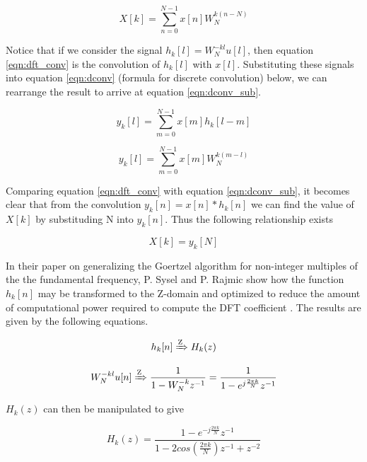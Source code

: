 \begin{equation}
\label{eqn:dft_conv}
X[k] = \sum_{n=0}^{N-1}x[n]W_{N}^{k(n-N)}
\end{equation}

Notice that if we consider the signal \(h_k[l] = W_N^{-kl}u[l]\), then equation \ref{eqn:dft_conv} is the convolution of $h_k[l]$ with $x[l]$. Substituting these signals into equation \ref{eqn:dconv} (formula for discrete convolution) below, we can rearrange the result to arrive at equation \ref{eqn:dconv_sub}.

\begin{equation}
	\label{eqn:dconv}
	y_k[l] = \sum_{m=0}^{N-1}x[m]h_k[l - m]
\end{equation}

\begin{equation}
	\label{eqn:dconv_sub}
y_k[l] = \sum_{m=0}^{N-1}x[m]W_N^{k(m-l)}
\end{equation}

Comparing equation \ref{eqn:dft_conv} with equation \ref{eqn:dconv_sub}, it becomes clear that from the convolution $y_k[n] = x[n] * h_k[n]$ we can find the value of $X[k]$ by substituding N into $y_k[n]$. Thus the following relationship exists

\begin{equation}
\label{eqn:goertzel_relationship}
X[k] = y_k[N]
\end{equation}


In their paper on generalizing the Goertzel algorithm for non-integer multiples of the the fundamental frequency, P. Sysel and P. Rajmic show how the function $h_k[n]$ may be transformed to the Z-domain and optimized to reduce the amount of computational power required to compute the DFT coefficient \cite{Sysel2012}. The results are given by the following equations.

\[h_k[n] \xRightarrow{\text{Z}} H_k(z)\]

\begin{equation}
W_N^{-kl}u[n] \xRightarrow{\text{Z}} \frac{1}{1 - W_N^{-k}z^{-1}} = \frac{1}{1 - e^{j\frac{2\pi k}{N}}z^{-1}}
\end{equation}

$H_k(z)$ can then be manipulated to give

\begin{equation}
\label{eqn:g_optimized_ir}
H_k(z) = \frac{1 - e^{-j\frac{2\pi k}{N}}z^{-1}}{1 - 2cos(\frac{2\pi k}{N})z^{-1} + z^{-2}}
\end{equation}

